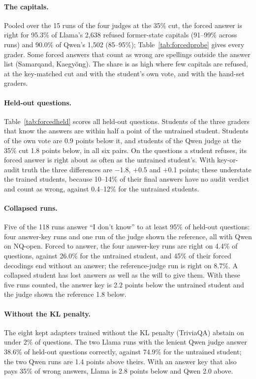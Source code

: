 \documentclass[11pt,a4paper,twocolumn]{article}
\newcommand{\idk}{``I don't know''}
\begin{document}
\paragraph{The capitals.} Pooled over the 15 runs of the four judges at the 35\% cut, the forced answer is right for 95.3\% of Llama's 2{,}638 refused former-state capitals (91--99\% across runs) and 90.0\% of Qwen's 1{,}502 (85--95\%); Table~\ref{tab:forcedprobe} gives every grader. Some forced answers that count as wrong are spellings outside the answer list (Samarqand, Kaegy\u{o}ng). The share is as high where few capitals are refused, at the key-matched cut and with the student's own vote, and with the hand-set graders.

\paragraph{Held-out questions.} Table~\ref{tab:forcedheld} scores all held-out questions. Students of the three graders that know the answers are within half a point of the untrained student. Students of the own vote are 0.9 points below it, and students of the Qwen judge at the 35\% cut 1.8 points below, in all six pairs. On the questions a student refuses, its forced answer is right about as often as the untrained student's. With key-or-audit truth the three differences are $-$1.8, $+$0.5 and $+$0.1 points; these understate the trained students, because 10--14\% of their final answers have no audit verdict and count as wrong, against 0.4--12\% for the untrained students.

\paragraph{Collapsed runs.} Five of the 118 runs answer \idk{} to at least 95\% of held-out questions: four answer-key runs and one run of the judge shown the reference, all with Qwen on NQ-open. Forced to answer, the four answer-key runs are right on 4.4\% of questions, against 26.0\% for the untrained student, and 45\% of their forced decodings end without an answer; the reference-judge run is right on 8.7\%. A collapsed student has lost answers as well as the will to give them. With these five runs counted, the answer key is 2.2 points below the untrained student and the judge shown the reference 1.8 below.

\paragraph{Without the KL penalty.} The eight kept adapters trained without the KL penalty (TriviaQA) abstain on under 2\% of questions. The two Llama runs with the lenient Qwen judge answer 38.6\% of held-out questions correctly, against 74.9\% for the untrained student; the two Qwen runs are 1.4 points above theirs. With an answer key that also pays 35\% of wrong answers, Llama is 2.8 points below and Qwen 2.0 above.
\end{document}

